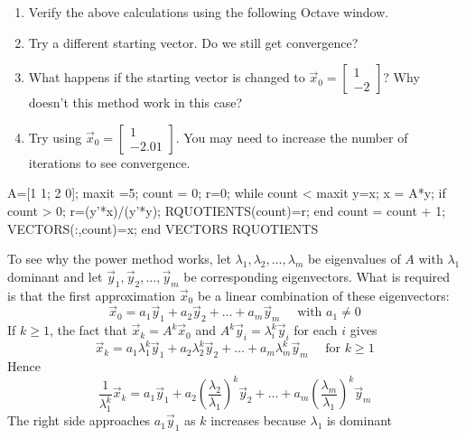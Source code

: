 \documentclass{ximera}
\begin{document}
\begin{exploration}
\begin{enumerate}
    \item\label{exp:2x2PowerMethod_a} Verify the above calculations using the following Octave window.
    \item\label{exp:2x2PowerMethod_b} Try a different starting vector.  Do we still get convergence?
    \item\label{exp:2x2PowerMethod_c} What happens if the starting vector is changed to $\vec{x}_{0} = \left[ \begin{array}{rr}
  1 \\
  -2
  \end{array}\right]$?  Why doesn't this method work in this case?
  \item\label{exp:2x2PowerMethod_d} Try using $\vec{x}_{0} = \left[ \begin{array}{rr}
  1 \\
  -2.01
  \end{array}\right]$.  You may need to increase the number of iterations to see convergence.
\end{enumerate}


A=[1 1; 2 0]; %
maxit =5; %
count = 0;
r=0;
    while count < maxit
    y=x;
    x = A*y;
        if count > 0; 
        r=(y'*x)/(y'*y);
        RQUOTIENTS(count)=r;
        end
    count = count + 1;
    VECTORS(:,count)=x;
end
VECTORS
RQUOTIENTS
\end{exploration}


To see why the power method works, let $\lambda_{1}, \lambda_{2}, \dots, \lambda_{m}$ be eigenvalues of $A$ with $\lambda_{1}$ dominant and let $\vec{y}_{1}, \vec{y}_{2}, \dots, \vec{y}_{m}$ be corresponding eigenvectors. What is required is that the first approximation $\vec{x}_{0}$ be a linear combination of these eigenvectors:
\begin{equation*}
\vec{x}_{0} = a_{1}\vec{y}_{1} + a_{2}\vec{y}_{2} + \dots + a_{m}\vec{y}_{m} \quad \mbox{ with } a_{1} \neq 0
\end{equation*}
If $k \geq 1$, the fact that $\vec{x}_{k} = A^{k}\vec{x}_{0}$ and $A^k\vec{y}_{i} = \lambda_{i}^k\vec{y}_{i}$ for each $i$ gives
\begin{equation*}
\vec{x}_{k} = a_{1}\lambda_{1}^k\vec{y}_{1} + a_{2}\lambda_{2}^k\vec{y}_{2} + \dots + a_{m}\lambda_{m}^k\vec{y}_{m} \quad \mbox{ for } k \geq 1
\end{equation*}
Hence
\begin{equation*}
\frac{1}{\lambda_{1}^k}\vec{x}_{k} = a_{1}\vec{y}_{1} + a_{2}\left(\frac{\lambda_{2}}{\lambda_{1}}\right)^k\vec{y}_{2} + \dots + a_{m}\left(\frac{\lambda_{m}}{\lambda_{1}}\right)^k\vec{y}_{m}
\end{equation*}
The right side approaches $a_{1}\vec{y}_{1}$ as $k$ increases because $\lambda_{1}$ is dominant 
\end{document}
